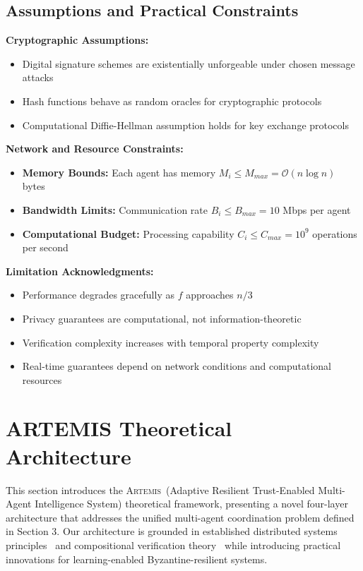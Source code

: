 \documentclass[conference]{IEEEtran}
\newcommand{\artemis}{\textsc{Artemis}}
\newcommand{\bigO}{\mathcal{O}}
\begin{document}
\subsection{Assumptions and Practical Constraints}

\textbf{Cryptographic Assumptions:}
\begin{itemize}
    \item Digital signature schemes are existentially unforgeable under chosen message attacks
    \item Hash functions behave as random oracles for cryptographic protocols
    \item Computational Diffie-Hellman assumption holds for key exchange protocols
\end{itemize}

\textbf{Network and Resource Constraints:}
\begin{itemize}
    \item \textbf{Memory Bounds:} Each agent has memory $M_i \leq M_{max} = \bigO(n \log n)$ bytes
    \item \textbf{Bandwidth Limits:} Communication rate $B_i \leq B_{max} = 10$ Mbps per agent
    \item \textbf{Computational Budget:} Processing capability $C_i \leq C_{max} = 10^9$ operations per second
\end{itemize}

\textbf{Limitation Acknowledgments:}
\begin{itemize}
    \item Performance degrades gracefully as $f$ approaches $n/3$
    \item Privacy guarantees are computational, not information-theoretic
    \item Verification complexity increases with temporal property complexity
    \item Real-time guarantees depend on network conditions and computational resources
\end{itemize}

\section{ARTEMIS Theoretical Architecture}

This section introduces the \artemis\ (Adaptive Resilient Trust-Enabled Multi-Agent Intelligence System) theoretical framework, presenting a novel four-layer architecture that addresses the unified multi-agent coordination problem defined in Section 3. Our architecture is grounded in established distributed systems principles~\cite{lynch1996distributed} and compositional verification theory~\cite{clarke1989compositional} while introducing practical innovations for learning-enabled Byzantine-resilient systems.
\end{document}
